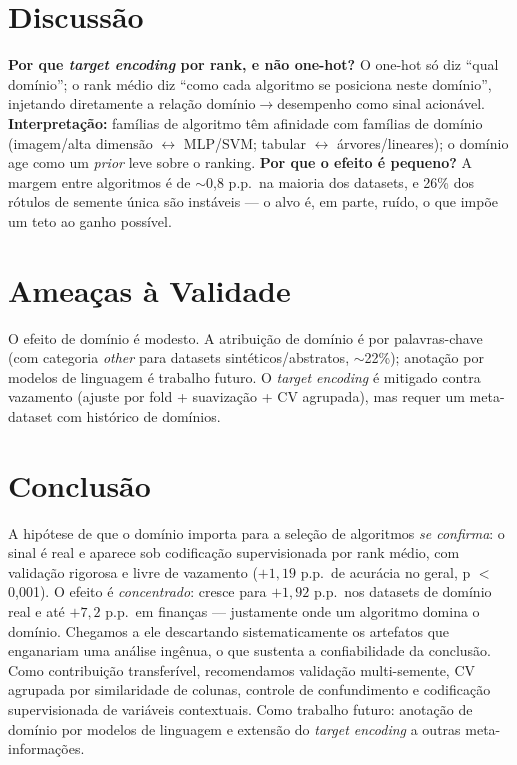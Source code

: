 \documentclass[12pt]{article}
\begin{document}
\section{Discussão}

\textbf{Por que \textit{target encoding} por rank, e não one-hot?} O one-hot só diz
``qual domínio''; o rank médio diz ``como cada algoritmo se posiciona neste
domínio'', injetando diretamente a relação domínio$\rightarrow$desempenho como
sinal acionável. \textbf{Interpretação:} famílias de algoritmo têm afinidade com
famílias de domínio (imagem/alta dimensão $\leftrightarrow$ MLP/SVM; tabular
$\leftrightarrow$ árvores/lineares); o domínio age como um \textit{prior} leve
sobre o ranking. \textbf{Por que o efeito é pequeno?} A margem entre algoritmos é
de $\sim$0,8 p.p.\ na maioria dos datasets, e 26\% dos rótulos de semente única são
instáveis --- o alvo é, em parte, ruído, o que impõe um teto ao ganho possível.

\section{Ameaças à Validade}

O efeito de domínio é modesto. A atribuição de domínio é por palavras-chave (com
categoria \textit{other} para datasets sintéticos/abstratos, $\sim$22\%); anotação
por modelos de linguagem é trabalho futuro. O \textit{target encoding} é mitigado
contra vazamento (ajuste por fold + suavização + CV agrupada), mas requer um
meta-dataset com histórico de domínios.

\section{Conclusão}

A hipótese de que o domínio importa para a seleção de algoritmos \emph{se confirma}:
o sinal é real e aparece sob codificação supervisionada por rank médio, com
validação rigorosa e livre de vazamento ($+1{,}19$ p.p.\ de acurácia no geral,
p $<$ 0,001). O efeito é \emph{concentrado}: cresce para $+1{,}92$ p.p.\ nos
datasets de domínio real e até $+7{,}2$ p.p.\ em finanças --- justamente onde um
algoritmo domina o domínio. Chegamos a ele descartando sistematicamente os
artefatos que enganariam uma análise ingênua, o que sustenta a confiabilidade da
conclusão. Como contribuição transferível, recomendamos
validação multi-semente, CV agrupada por similaridade de colunas, controle de
confundimento e codificação supervisionada de variáveis contextuais. Como trabalho
futuro: anotação de domínio por modelos de linguagem e extensão do \textit{target
encoding} a outras meta-informações.



\end{document}
